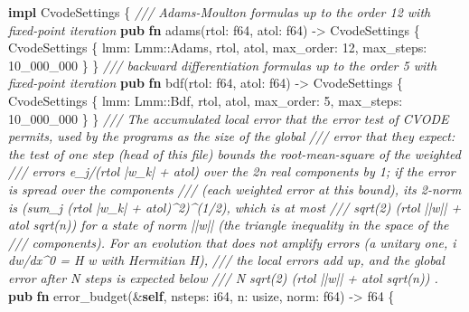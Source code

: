 \documentclass[
  10pt,
]{article}
\newenvironment{Shaded}{}{}
\newcommand{\CommentTok}[1]{\textcolor[rgb]{0.38,0.63,0.69}{\textit{#1}}}
\newcommand{\DataTypeTok}[1]{\textcolor[rgb]{0.56,0.13,0.00}{#1}}
\newcommand{\DecValTok}[1]{\textcolor[rgb]{0.25,0.63,0.44}{#1}}
\newcommand{\KeywordTok}[1]{\textcolor[rgb]{0.00,0.44,0.13}{\textbf{#1}}}
\newcommand{\NormalTok}[1]{#1}
\newcommand{\OperatorTok}[1]{\textcolor[rgb]{0.40,0.40,0.40}{#1}}
\newcommand{\PreprocessorTok}[1]{\textcolor[rgb]{0.74,0.48,0.00}{#1}}
\begin{document}
\begin{Shaded}
\begin{Highlighting}[]
\KeywordTok{impl}\NormalTok{ CvodeSettings }\OperatorTok{\{}
    \CommentTok{/// Adams{-}Moulton formulas up to the order 12 with fixed{-}point iteration}
    \KeywordTok{pub} \KeywordTok{fn}\NormalTok{ adams(rtol}\OperatorTok{:} \DataTypeTok{f64}\OperatorTok{,}\NormalTok{ atol}\OperatorTok{:} \DataTypeTok{f64}\NormalTok{) }\OperatorTok{{-}\textgreater{}}\NormalTok{ CvodeSettings }\OperatorTok{\{}
\NormalTok{        CvodeSettings }\OperatorTok{\{}\NormalTok{ lmm}\OperatorTok{:} \PreprocessorTok{Lmm::}\NormalTok{Adams}\OperatorTok{,}\NormalTok{ rtol}\OperatorTok{,}\NormalTok{ atol}\OperatorTok{,}\NormalTok{ max\_order}\OperatorTok{:} \DecValTok{12}\OperatorTok{,}\NormalTok{ max\_steps}\OperatorTok{:} \DecValTok{10\_000\_000} \OperatorTok{\}}
    \OperatorTok{\}}
    \CommentTok{/// backward differentiation formulas up to the order 5 with fixed{-}point iteration}
    \KeywordTok{pub} \KeywordTok{fn}\NormalTok{ bdf(rtol}\OperatorTok{:} \DataTypeTok{f64}\OperatorTok{,}\NormalTok{ atol}\OperatorTok{:} \DataTypeTok{f64}\NormalTok{) }\OperatorTok{{-}\textgreater{}}\NormalTok{ CvodeSettings }\OperatorTok{\{}
\NormalTok{        CvodeSettings }\OperatorTok{\{}\NormalTok{ lmm}\OperatorTok{:} \PreprocessorTok{Lmm::}\NormalTok{Bdf}\OperatorTok{,}\NormalTok{ rtol}\OperatorTok{,}\NormalTok{ atol}\OperatorTok{,}\NormalTok{ max\_order}\OperatorTok{:} \DecValTok{5}\OperatorTok{,}\NormalTok{ max\_steps}\OperatorTok{:} \DecValTok{10\_000\_000} \OperatorTok{\}}
    \OperatorTok{\}}
    \CommentTok{/// The accumulated local error that the error test of CVODE permits, used by the programs as the size of the global}
    \CommentTok{/// error that they expect: the test of one step (head of this file) bounds the root{-}mean{-}square of the weighted}
    \CommentTok{/// errors e\_j/(rtol |w\_k| + atol) over the 2n real components by 1; if the error is spread over the components}
    \CommentTok{/// (each weighted error at this bound), its 2{-}norm is (sum\_j (rtol |w\_k| + atol)\^{}2)\^{}(1/2), which is at most}
    \CommentTok{/// sqrt(2) (rtol ||w|| + atol sqrt(n)) for a state of norm ||w|| (the triangle inequality in the space of the}
    \CommentTok{/// components).  For an evolution that does not amplify errors (a unitary one, i dw/dx\^{}0 = H w with Hermitian H),}
    \CommentTok{/// the local errors add up, and the global error after N steps is expected below}
    \CommentTok{///     N sqrt(2) (rtol ||w|| + atol sqrt(n)) .}
    \KeywordTok{pub} \KeywordTok{fn}\NormalTok{ error\_budget(}\OperatorTok{\&}\KeywordTok{self}\OperatorTok{,}\NormalTok{ nsteps}\OperatorTok{:} \DataTypeTok{i64}\OperatorTok{,}\NormalTok{ n}\OperatorTok{:} \DataTypeTok{usize}\OperatorTok{,}\NormalTok{ norm}\OperatorTok{:} \DataTypeTok{f64}\NormalTok{) }\OperatorTok{{-}\textgreater{}} \DataTypeTok{f64} \OperatorTok{\{}

\end{Highlighting}
\end{Shaded}
\end{document}
